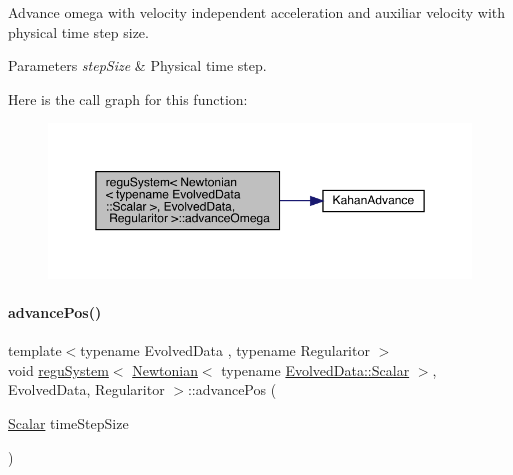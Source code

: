 Advance omega with velocity independent acceleration and auxiliar velocity with physical time step size. 
\begin{DoxyParams}{Parameters}
{\em step\+Size} & Physical time step. \\
\hline
\end{DoxyParams}
Here is the call graph for this function\+:\nopagebreak
\begin{figure}[H]
\begin{center}
\leavevmode
\includegraphics[width=350pt]{classregu_system_3_01_newtonian_3_01typename_01_evolved_data_1_1_scalar_01_4_00_01_evolved_data_00_01_regularitor_01_4_a114c39dbc724ee6cda9f2b3da8d1ff3c_cgraph}
\end{center}
\end{figure}
\mbox{\label{classregu_system_3_01_newtonian_3_01typename_01_evolved_data_1_1_scalar_01_4_00_01_evolved_data_00_01_regularitor_01_4_ae0b6977439ce7171e5ef5767237e050d}} 
\paragraph{\texorpdfstring{advance\+Pos()}{advancePos()}}
{\footnotesize\ttfamily template$<$typename Evolved\+Data , typename Regularitor $>$ \\
void \mbox{\hyperlink{classregu_system}{regu\+System}}$<$ \mbox{\hyperlink{class_newtonian}{Newtonian}}$<$ typename \mbox{\hyperlink{classregu_system_aca8ee2c387943164ee3ea68370fc3ac0}{Evolved\+Data\+::\+Scalar}} $>$, Evolved\+Data, Regularitor $>$\+::advance\+Pos (\begin{DoxyParamCaption}\item[{\mbox{\hyperlink{classregu_system_3_01_newtonian_3_01typename_01_evolved_data_1_1_scalar_01_4_00_01_evolved_data_00_01_regularitor_01_4_a6993f135075541f441a7642845b183a5}{Scalar}}}]{time\+Step\+Size }\end{DoxyParamCaption})}



